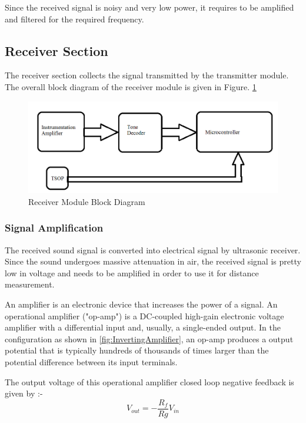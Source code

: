 Since the received signal is noisy and very low power, it requires to be amplified and 
filtered for the required frequency.
\subsection{Receiver Section}
The receiver section collects the signal transmitted by the transmitter module. The overall block diagram of the receiver module is given in Figure. \ref{fig:ReceiverOne}
\begin{figure}[h!]
	\centering
	\includegraphics[width=120mm]{Images/ReceiverOne.png}
	\caption{Receiver Module Block Diagram}
	\label{fig:ReceiverOne}
\end{figure}

\subsubsection{Signal Amplification}

The received sound signal is converted into electrical signal by ultrasonic receiver. Since the sound undergoes massive attenuation in air, the received signal is pretty low in voltage and needs to be amplified in order to use it for distance measurement. 

An amplifier is an electronic device that increases the power of a signal. An operational amplifier ("op-amp") is a DC-coupled high-gain electronic voltage amplifier with a differential input and, usually, a single-ended output. In the configuration as shown in \ref{fig:InvertingAmplifier}, an op-amp produces a output potential that is typically hundreds of thousands of times larger than the potential difference between its input terminals. 



The output voltage of this operational amplifier closed loop negative feedback is given by :-
\begin{equation}
	V_{out} = -\frac{R_f}{Rg}V_{in}
\end{equation} 


